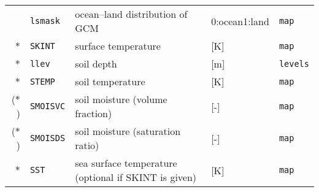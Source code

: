 {\begin{table}[bth]
\begin{center}
\begin{tabularx}{150mm}{rl|l|l|X}
       &\verb|lsmask|  & ocean--land distribution of GCM & 0:ocean1:land & \verb|map| \\
$\ast$ &\verb|SKINT|   & surface temperature      & [K]         & \verb|map| \\
$\ast$ &\verb|llev|    & soil depth  & [m]        & \verb|levels| \\
$\ast$ &\verb|STEMP|   & soil temperature         & [K]         & \verb|map| \\
($\ast$) &\verb|SMOISVC| & soil moisture (volume fraction)  & [-] & \verb|map| \\
($\ast$) &\verb|SMOISDS| & soil moisture (saturation ratio) & [-] & \verb|map| \\
$\ast$ &\verb|SST|     & sea surface temperature (optional if SKINT is given) & [K] & \verb|map|\\\hline
\end{tabularx}
\end{center}
\end{table}
}
